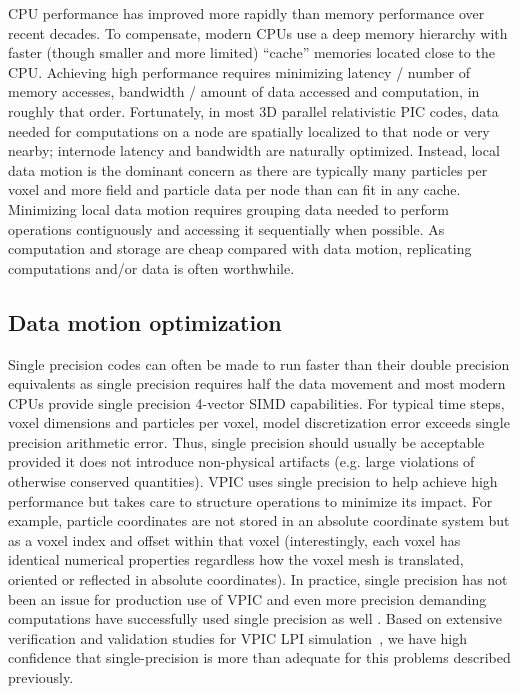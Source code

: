 \documentclass[10pt]{article}
\begin{document}
CPU performance has improved more rapidly than memory performance over
recent decades.  To compensate, modern CPUs use a deep memory
hierarchy with faster (though smaller and more limited) ``cache''
memories located close to the CPU.  Achieving high performance
requires minimizing latency / number of memory accesses, bandwidth /
amount of data accessed and computation, in roughly that order.
Fortunately, in most 3D parallel relativistic PIC codes, data needed
for computations on a node are spatially localized to that node or
very nearby; internode latency and bandwidth are naturally optimized.
Instead, local data motion is the dominant concern as there are
typically many particles per voxel and more field and particle data
per node than can fit in any cache.  Minimizing local data motion
requires grouping data needed to perform operations contiguously and
accessing it sequentially when possible.  As computation and storage
are cheap compared with data motion, replicating computations and/or
data is often worthwhile.

\subsection{Data motion optimization}

Single precision codes can often be made to run faster than their
double precision equivalents as single precision requires half the
data movement and most modern CPUs provide single precision 4-vector
SIMD capabilities.  For typical time steps, voxel dimensions and
particles per voxel, model discretization error exceeds single
precision arithmetic error.  Thus, single precision should usually be
acceptable provided it does not introduce non-physical artifacts
(e.g. large violations of otherwise conserved quantities).  VPIC uses
single precision to help achieve high performance but takes care to
structure operations to minimize its impact.  For example, particle
coordinates are not stored in an absolute coordinate system but as a
voxel index and offset within that voxel (interestingly, each voxel
has identical numerical properties regardless how the voxel mesh is
translated, oriented or reflected in absolute coordinates).  In
practice, single precision has not been an issue for production use of
VPIC and even more precision demanding computations have successfully
used single precision as well
\cite{Bowers_et_al_2006,Langou_et_al_2006,Lippert_et_al_2007}.
Based on extensive verification and validation studies for VPIC LPI
simulation~\cite{Yin_et_al_Phys_Plasmas_2006}, we have high confidence
that single-precision is more than adequate for this problems
described previously.
\end{document}
